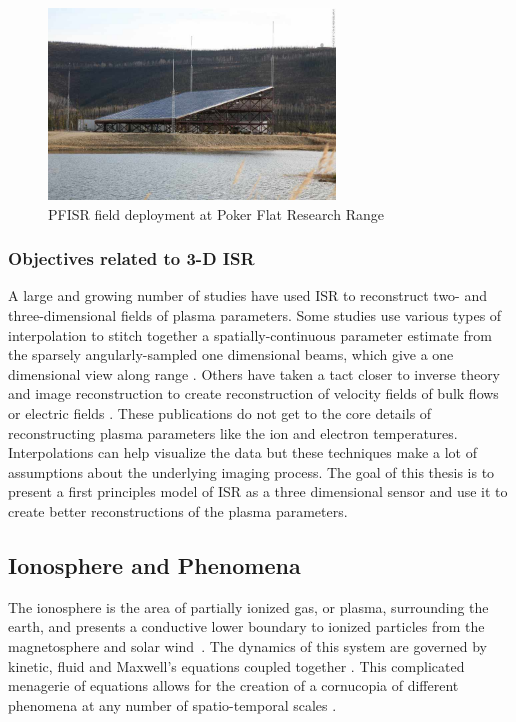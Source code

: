 \begin{figure}[!t]
\centering
\includegraphics[width=3in]{amisrimage2}
\caption{PFISR field deployment at Poker Flat Research Range~\cite{Valentic:2013jg}}
%
%
\label{fig:amisrpic}
\end{figure}

\subsubsection{Objectives related to 3-D ISR}
A large and growing number of studies have used ISR to reconstruct two- and three-dimensional fields of plasma parameters. Some studies use various types of interpolation to stitch together a spatially-continuous parameter estimate from the sparsely angularly-sampled one dimensional beams, which give a one dimensional view along range \cite{Semeter2009738,Butler:2013ul,Semeter:2005fo}. Others have taken a tact closer to inverse theory and image reconstruction to create reconstruction of velocity fields of bulk flows or electric fields \cite{butler:imagingfregiondrifts,RDS:RDS20195}. These publications do not get to the core details of reconstructing plasma parameters like the ion and electron temperatures. Interpolations can help visualize the data but these techniques make a lot of assumptions about the underlying imaging process. The goal of this thesis is to present a first principles model of ISR as a three dimensional sensor and use it to create better reconstructions of the plasma parameters.
%
%

\subsection{Ionosphere and Phenomena}
The ionosphere is the area of partially ionized gas, or plasma, surrounding the earth, and presents a conductive lower boundary to ionized particles from the magnetosphere and solar wind~\cite{kellybook}. The dynamics of this system are governed by kinetic, fluid and Maxwell's equations coupled together \cite{schunk2004ionospheres}. This complicated menagerie of equations allows for the creation of a cornucopia of different phenomena at any number of spatio-temporal scales \cite{Semeter:2008hs,Semeter2009738}.

